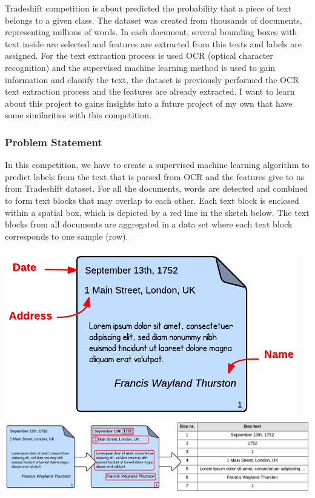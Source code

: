 \documentclass[11pt]{article}
\makeatletter
\def\maxwidth{\ifdim\Gin@nat@width>\linewidth\linewidth
    \else\Gin@nat@width\fi}
\let\Oldincludegraphics\includegraphics
\renewcommand{\includegraphics}[1]{\Oldincludegraphics[width=.8\maxwidth]{#1}}
\makeatother
\begin{document}
Tradeshift competition is about predicted the probability that a piece
of text belongs to a given class. The dataset was created from thousands
of documents, representing millions of words. In each document, several
bounding boxes with text inside are selected and features are extracted
from this texts and labels are assigned. For the text extraction process
is used OCR (optical character recognition) and the supervised machine
learning method is used to gain information and classify the text, the
dataset is previously performed the OCR text extraction process and the
features are already extracted. I want to learn about this project to
gains insights into a future project of my own that have some
similarities with this competition.

    \hypertarget{problem-statement}{%
\subsubsection{Problem Statement}\label{problem-statement}}

In this competition, we have to create a supervised machine learning
algorithm to predict labels from the text that is parsed from OCR and
the features give to us from Tradeshift dataset. For all the documents,
words are detected and combined to form text blocks that may overlap to
each other. Each text block is enclosed within a spatial box, which is
depicted by a red line in the sketch below. The text blocks from all
documents are aggregated in a data set where each text block corresponds
to one sample (row).

    \includegraphics{imgs/text-classification.png}
\includegraphics{imgs/text-classification-2.png}
\end{document}
